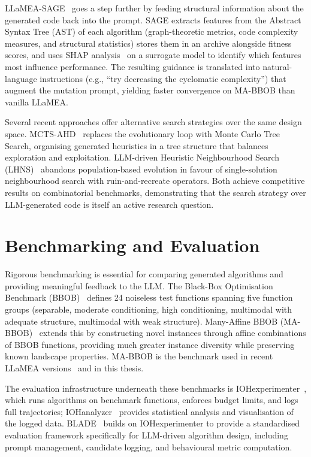 LLaMEA-SAGE~\cite{vanStein2026LLaMEASAGE} goes a step further by feeding structural information about the generated code back into the prompt. SAGE extracts features from the Abstract Syntax Tree (AST) of each algorithm (graph-theoretic metrics, code complexity measures, and structural statistics) stores them in an archive alongside fitness scores, and uses SHAP analysis~\cite{lundberg2017shap} on a surrogate model to identify which features most influence performance. The resulting guidance is translated into natural-language instructions (e.g., ``try decreasing the cyclomatic complexity'') that augment the mutation prompt, yielding faster convergence on MA-BBOB than vanilla LLaMEA.

Several recent approaches offer alternative search strategies over the same design space. MCTS-AHD~\cite{zheng2025mctsahd} replaces the evolutionary loop with Monte Carlo Tree Search, organising generated heuristics in a tree structure that balances exploration and exploitation. LLM-driven Heuristic Neighbourhood Search (LHNS)~\cite{xie2025lhns} abandons population-based evolution in favour of single-solution neighbourhood search with ruin-and-recreate operators. Both achieve competitive results on combinatorial benchmarks, demonstrating that the search strategy over LLM-generated code is itself an active research question.

\section{Benchmarking and Evaluation}
\label{sec:bg-benchmarking}

Rigorous benchmarking is essential for comparing generated algorithms and providing meaningful feedback to the LLM. The Black-Box Optimisation Benchmark (BBOB)~\cite{hansen2021coco} defines 24 noiseless test functions spanning five function groups (separable, moderate conditioning, high conditioning, multimodal with adequate structure, multimodal with weak structure). Many-Affine BBOB (MA-BBOB)~\cite{vermetten2023mabbob} extends this by constructing novel instances through affine combinations of BBOB functions, providing much greater instance diversity while preserving known landscape properties. MA-BBOB is the benchmark used in recent LLaMEA versions~\cite{vanStein2026LLaMEASAGE} and in this thesis.

The evaluation infrastructure underneath these benchmarks is IOHexperimenter~\cite{deNobel2024iohexperimenter}, which runs algorithms on benchmark functions, enforces budget limits, and logs full trajectories; IOHanalyzer~\cite{wang2022iohanalyzer} provides statistical analysis and visualisation of the logged data. BLADE~\cite{vanStein2025BLADE} builds on IOHexperimenter to provide a standardised evaluation framework specifically for LLM-driven algorithm design, including prompt management, candidate logging, and behavioural metric computation.

